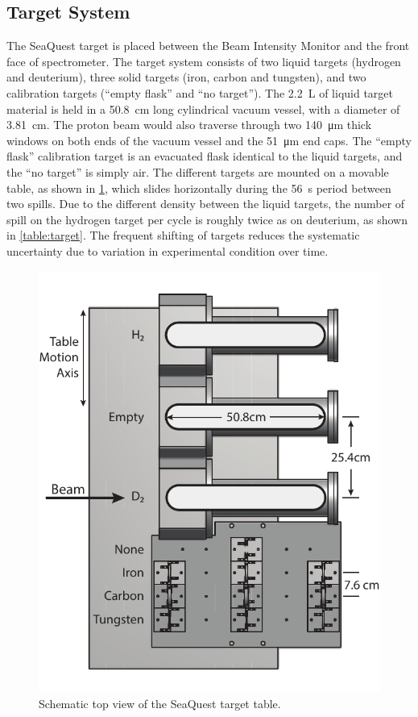 \documentclass[reprint,aps,unsortedaddress,superscriptaddress,prc,floatfix,showpacs,linenumbers]{revtex4-2}
\begin{document}
\subsection{Target System}
The SeaQuest target is placed between the Beam Intensity Monitor and the front face
of spectrometer. The target system consists of two liquid targets (hydrogen and deuterium),
three solid targets (iron, carbon and tungsten), and two calibration targets (``empty flask'' and ``no target'').
The \SI{2.2}{\liter} of liquid target material is held
in a \SI{50.8}{\cm} long cylindrical vacuum vessel, with a diameter of \SI{3.81}{\cm}.
The proton beam would also traverse through two
\SI{140}{\um} thick windows on both ends of the vacuum vessel and the \SI{51}{\um} end caps.
The ``empty flask'' calibration target is an evacuated flask identical to the liquid targets,
and the ``no target'' is simply air.
The different targets are mounted on a movable table, as shown in \cref{fig:target_table},
which slides horizontally during the \SI{56}{\s} period between two spills.
Due to the different density between the liquid targets, the number of spill on the
hydrogen target per cycle is roughly twice as on deuterium, as shown in \cref{table:target}.
The frequent shifting of targets reduces the systematic uncertainty due to variation in experimental condition over time. 
\begin{figure}[htb]
	\centering
	\includegraphics[width=\linewidth]{spectrometer/target-tableLayout.pdf}
	\caption{Schematic top view of the SeaQuest target table.}
	\label{fig:target_table}
\end{figure}
\end{document}
